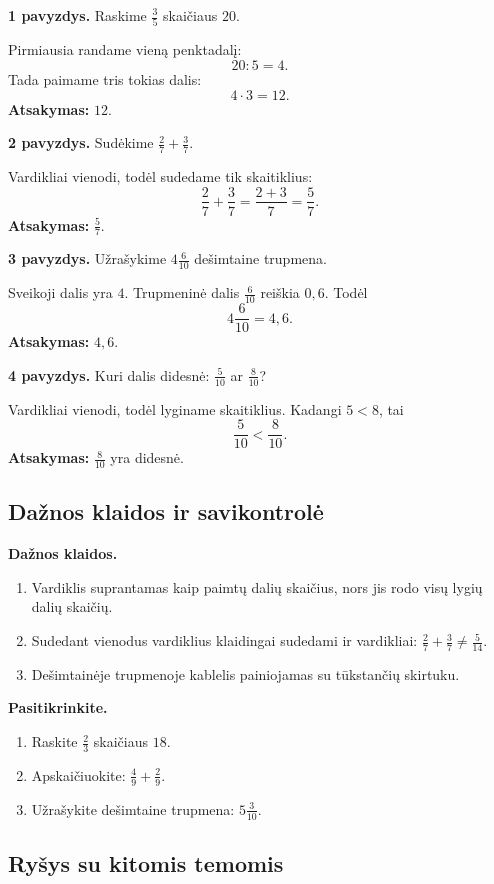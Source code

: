 \textbf{1 pavyzdys.} Raskime \(\frac{3}{5}\) skaičiaus \(20\).

Pirmiausia randame vieną penktadalį:
\[
20:5=4.
\]
Tada paimame tris tokias dalis:
\[
4\cdot3=12.
\]
\textbf{Atsakymas:} \(12\).

\textbf{2 pavyzdys.} Sudėkime \(\frac{2}{7}+\frac{3}{7}\).

Vardikliai vienodi, todėl sudedame tik skaitiklius:
\[
\frac{2}{7}+\frac{3}{7}=\frac{2+3}{7}=\frac{5}{7}.
\]
\textbf{Atsakymas:} \(\frac{5}{7}\).

\textbf{3 pavyzdys.} Užrašykime \(4\frac{6}{10}\) dešimtaine trupmena.

Sveikoji dalis yra \(4\). Trupmeninė dalis \(\frac{6}{10}\) reiškia \(0,6\). Todėl
\[
4\frac{6}{10}=4,6.
\]
\textbf{Atsakymas:} \(4,6\).

\textbf{4 pavyzdys.} Kuri dalis didesnė: \(\frac{5}{10}\) ar \(\frac{8}{10}\)?

Vardikliai vienodi, todėl lyginame skaitiklius. Kadangi \(5<8\), tai
\[
\frac{5}{10}<\frac{8}{10}.
\]
\textbf{Atsakymas:} \(\frac{8}{10}\) yra didesnė.

\subsection{Dažnos klaidos ir savikontrolė}

\textbf{Dažnos klaidos.}
\begin{enumerate}[label=\arabic*.]
\item Vardiklis suprantamas kaip paimtų dalių skaičius, nors jis rodo visų lygių dalių skaičių.
\item Sudedant vienodus vardiklius klaidingai sudedami ir vardikliai: \(\frac{2}{7}+\frac{3}{7}\neq\frac{5}{14}\).
\item Dešimtainėje trupmenoje kablelis painiojamas su tūkstančių skirtuku.
\end{enumerate}

\textbf{Pasitikrinkite.}
\begin{enumerate}[label=\arabic*.]
\item Raskite \(\frac{2}{3}\) skaičiaus \(18\).
\item Apskaičiuokite: \(\frac{4}{9}+\frac{2}{9}\).
\item Užrašykite dešimtaine trupmena: \(5\frac{3}{10}\).
\end{enumerate}

\subsection{Ryšys su kitomis temomis}

